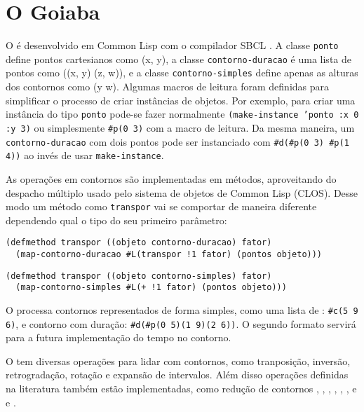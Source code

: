 \section{O Goiaba}
\label{sec:o-software}

O \goiaba{} é desenvolvido em Common Lisp com o compilador SBCL
\cite{team07:sbcl}. A classe \texttt{ponto} define pontos cartesianos
como (x, y), a classe \texttt{contorno-duracao} é uma lista de pontos
como ((x, y) (z, w)), e a classe \texttt{contorno-simples} define
apenas as alturas dos contornos como (y w). Algumas macros de leitura
foram definidas para simplificar o processo de criar instâncias de
objetos. Por exemplo, para criar uma instância do tipo \texttt{ponto}
pode-se fazer normalmente \texttt{(make-instance 'ponto :x 0 :y 3)} ou
simplesmente \verb!#p(0 3)! com a macro de leitura. Da mesma maneira,
um \texttt{contorno-duracao} com dois pontos pode ser instanciado com
\verb!#d(#p(0 3) #p(1 4))! ao invés de usar \texttt{make-instance}.

As operações em contornos são implementadas em métodos, aproveitando
do despacho múltiplo usado pelo sistema de objetos de Common Lisp
(CLOS). Desse modo um método como \texttt{transpor} vai se comportar
de maneira diferente dependendo qual o tipo do seu primeiro parâmetro:

\begin{verbatim}
(defmethod transpor ((objeto contorno-duracao) fator)
  (map-contorno-duracao #L(transpor !1 fator) (pontos objeto)))
\end{verbatim}

\begin{verbatim}
(defmethod transpor ((objeto contorno-simples) fator)
  (map-contorno-simples #L(+ !1 fator) (pontos objeto)))
\end{verbatim}

O \goiaba{} processa contornos representados de forma simples, como
uma lista de : \verb!#c(5 9 6)!, e contorno com
duração: \verb!#d(#p(0 5)(1 9)(2 6))!. O segundo formato servirá para
a futura implementação do tempo no contorno.

O \goiaba{} tem diversas operações para lidar com contornos, como
tranposição, inversão, retrogradação, rotação e expansão de
intervalos. Além disso operações definidas na literatura também estão
implementadas, como redução de contornos \cite{adams76:melodic},
, , , , ,
 e  \cite{friedmann85:methodology} e
 \cite{morris93:directions}.

